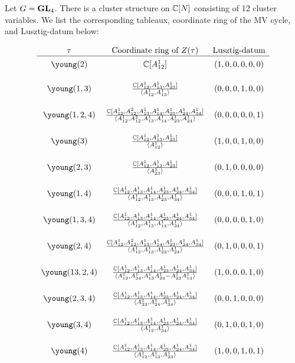 \documentclass{article} %
\begin{document}
Let $G = {\mathbf{GL}}_4$. There is a cluster structure on $\mathbb C[N]$ consisting of 12 cluster variables. We list the corresponding tableaux, coordinate ring of the MV cycle, and Lusztig-datum below:


\[
\begin{array}{ccc} 
\tau & \text{Coordinate ring of }Z(\tau) & \text{Lusztig-datum} \\ \hline
\young(2) & \CC[A_{12}^1] & (1,0,0,0,0,0) \rule{0pt}{3ex}\\
\young(1,3) & \frac{\CC[A_{12}^1,A_{13}^1,A_{23}^1]}{\langle A_{12}^1,A_{13}^1 \rangle} & (0,0,0,1,0,0) \TS\BS\\
\young(1,2,4) & \frac{\CC[A_{12}^1,A_{12}^2,A_{13}^1,A_{14}^1,A_{23}^1,A_{24}^1,A_{34}^1]}{\langle A_{12}^1,A_{12}^2,A_{13}^1,A_{14}^1,A_{23}^1,A_{24}^1 \rangle} & (0,0,0,0,0,1) \TS\BS\\
\young(3) & \frac{\CC[A_{12}^1,A_{13}^1,A_{23}^1]}{\langle A_{12}^1 \rangle} & (1,0,0,1,0,0) \TS\BS\\
\young(2,3) & \frac{\CC[A_{12}^1,A_{13}^1,A_{23}^1]}{\langle A_{23}^1 \rangle} & (0,1,0,0,0,0) \TS\BS\\
\young(1,4) & \frac{\CC[A_{12}^1,A_{13}^1,A_{14}^1,A_{23}^1,A_{24}^1,A_{34}^1]}{\langle A_{12}^1,A_{13}^1,A_{23}^1,A_{34}^1 \rangle} & (0,0,0,1,0,1) \TS\BS\\
\young(1,3,4) & \frac{\CC[A_{12}^1,A_{13}^1,A_{14}^1,A_{23}^1,A_{24}^1,A_{34}^1]}{\langle A_{12}^1,A_{13}^1,A_{14}^1,A_{34}^1 \rangle} & (0,0,0,0,1,0) \TS\BS\\
\young(2,4) & \frac{\CC[A_{12}^1,A_{12}^2,A_{13}^1,A_{14}^1,A_{23}^1,A_{24}^1,A_{34}^1]}{\langle A_{12}^1,A_{13}^1,A_{23}^1,A_{24}^1 \rangle} & (0,1,0,0,0,1) \TS\BS\\
\young(13,2,4) & \frac{\CC[A_{12}^1,A_{13}^1,A_{14}^1,A_{23}^1,A_{24}^1,A_{34}^1]}{\langle A_{12}^1,A_{34}^1,A_{13}^1A_{24}^1-A_{23}^1A_{14}^1 \rangle} & (1,0,0,0,1,0) \TS\BS\\
\young(2,3,4) & \frac{\CC[A_{12}^1,A_{13}^1,A_{14}^1,A_{23}^1,A_{24}^1,A_{34}^1]}{\langle A_{23}^1,A_{24}^1,A_{34}^1 \rangle} & (0,0,1,0,0,0) \TS\BS\\
\young(3,4) & \frac{\CC[A_{12}^1,A_{13}^1,A_{14}^1,A_{23}^1,A_{24}^1,A_{34}^1]}{\langle A_{12}^1,A_{34}^1 \rangle} & (0,1,0,0,1,0) \TS\BS\\
\young(4) & \frac{\CC[A_{12}^1,A_{13}^1,A_{14}^1,A_{23}^1,A_{24}^1,A_{34}^1]}{\langle A_{12}^1,A_{13}^1,A_{23}^1 \rangle} & (1,0,0,1,0,1) \TS\BS\\
\end{array}
\]
\end{document}
